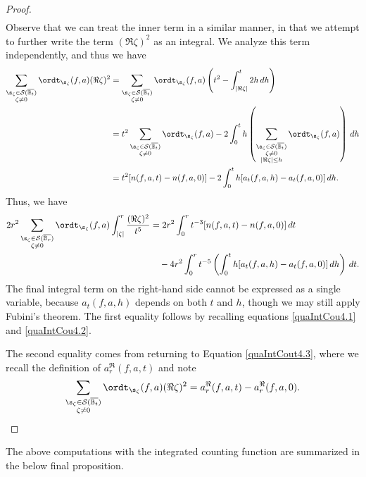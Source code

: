 \documentclass{amsart}
\begin{document}
\begin{proof}
\begin{align}
\end{align}
Observe that we can treat the inner term in a similar manner, in that we attempt to further write the term $(\Re \zeta)^2$ as an integral. We analyze this term independently, and thus we have \begin{align}\label{quaIntCou4.2}
\sum_{\substack{ \s_\zeta\in\mathcal{S}(\overline{\mathbb B_t}) \\ \zeta\neq 0}}\ordt_{\s_\zeta}(f,a)(\Re \zeta)^2 
&= \sum_{\substack{ \s_\zeta\in\mathcal{S}(\overline{\mathbb B_t}) \nonumber \\ \zeta\neq 0}}\ordt_{\s_\zeta}(f,a)\left(t^2 -\int_{|\Re \zeta|}^t2h \,dh\right) \\
&= t^2 \sum_{\substack{ \s_\zeta\in\mathcal{S}(\overline{\mathbb B_t}) \nonumber\\ \zeta\neq 0}}\ordt_{\s_\zeta}(f,a)-2\int_0^t h\left( \sum_{\substack{ \s_\zeta\in\mathcal{S}(\overline{\mathbb B_t}) \\ \zeta\neq 0 \\|\Re \zeta|\leq h}}\ordt_{\s_\zeta}(f,a)\right)\,dh \\ 
&=t^2[n(f,a,t)-n(f,a,0)]-2\int_0^t h [a_t(f,a,h)-a_t(f,a,0)]\,dh.
\end{align}
Thus, we have \begin{align*}
      2r^2\sum_{\substack{ \s_\zeta\in\mathcal{S}(\overline{\mathbb B_r}) \\ \zeta\neq 0}}\ordt_{\s_\zeta}(f,a)\int_{|\zeta|}^r\frac{(\Re \zeta)^2}{t^5} 
      &= 2r^2\int_0^rt^{-3}[n(f,a,t)-n(f,a,0)]\, dt \\
      &\quad- 4r^2\int_0^rt^{-5}\left(\int_0^th[a_t(f,a,h)-a_t(f,a,0)]\,dh \right)\,dt. 
\end{align*}
The final integral term on the right-hand side cannot be expressed as a single variable, because $a_t(f,a,h)$ depends on both $t$ and $h$, though we may still apply Fubini's theorem. The first equality follows by recalling equations \ref{quaIntCou4.1} and \ref{quaIntCou4.2}. 

The second equality comes from returning to Equation \ref{quaIntCout4.3}, where we recall the definition of $a_r^\Re (f,a,t)$ and note \[\sum_{\substack{ \s_\zeta\in\mathcal{S}(\overline{\mathbb B_t}) \\ \zeta\neq 0}}\ordt_{\s_\zeta}(f,a)(\Re \zeta)^2=a_r^\Re (f,a,t)-a_r^\Re (f,a,0).\] 

\end{proof}

The above computations with the integrated counting function are summarized in the below final proposition. 
\end{document}
